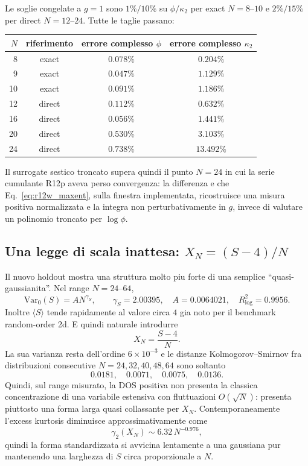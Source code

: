 \documentclass[11pt,a4paper]{article}
\begin{document}
Le soglie congelate a $g=1$ sono $1\%/10\%$ su $\phi/\kappa_2$ per exact $N=8$--$10$ e $2\%/15\%$ per direct $N=12$--$24$. Tutte le taglie passano:
\begin{center}
\begin{tabular}{rccc}
\toprule
$N$ & riferimento & errore complesso $\phi$ & errore complesso $\kappa_2$\\
\midrule
8  & exact  & $0.078\%$ & $0.204\%$\\
9  & exact  & $0.047\%$ & $1.129\%$\\
10 & exact  & $0.091\%$ & $1.186\%$\\
12 & direct & $0.112\%$ & $0.632\%$\\
16 & direct & $0.056\%$ & $1.441\%$\\
20 & direct & $0.530\%$ & $3.103\%$\\
24 & direct & $0.738\%$ & $13.492\%$\\
\bottomrule
\end{tabular}
\end{center}
Il surrogate sestico troncato supera quindi il punto $N=24$ in cui la serie cumulante R12p aveva perso convergenza: la differenza e che Eq.~\eqref{eq:r12w_maxent}, sulla finestra implementata, ricostruisce una misura positiva normalizzata e la integra non perturbativamente in $g$, invece di valutare un polinomio troncato per $\log\phi$.

\subsection{Una legge di scala inattesa: $X_N=(S-4)/N$}

Il nuovo holdout mostra una struttura molto piu forte di una semplice ``quasi-gaussianita''. Nel range $N=24$--$64$,
\begin{equation}
 \boxed{\mathrm{Var}_0(S)=A N^{\gamma_S},\qquad
 \gamma_S=2.00395,\quad A=0.0064021,\quad R^2_{\log}=0.9956.}
 \label{eq:r12w_varN2}
\end{equation}
Inoltre $\langle S\rangle$ tende rapidamente al valore circa $4$ gia noto per il benchmark random-order 2d. E quindi naturale introdurre
\begin{equation}
 \boxed{X_N=\frac{S-4}{N}.}
 \label{eq:r12w_scaledX}
\end{equation}
La sua varianza resta dell'ordine $6\times10^{-3}$ e le distanze Kolmogorov--Smirnov fra distribuzioni consecutive $N=24,32,40,48,64$ sono soltanto
\begin{equation}
0.0181,\quad0.0071,\quad0.0075,\quad0.0136.
\end{equation}
Quindi, sul range misurato, la DOS positiva non presenta la classica concentrazione di una variabile estensiva con fluttuazioni $O(\sqrt N)$: presenta piuttosto una forma larga quasi collassante per $X_N$. Contemporaneamente l'excess kurtosis diminuisce approssimativamente come
\begin{equation}
 \gamma_2(X_N)\sim6.32\,N^{-0.976},
\end{equation}
quindi la forma standardizzata si avvicina lentamente a una gaussiana pur mantenendo una larghezza di $S$ circa proporzionale a $N$.
\end{document}
